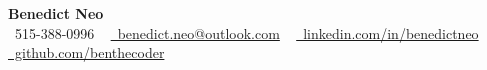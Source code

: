 \begin{center}
    \textbf{\Huge Benedict Neo} \\ \vspace{10pt}
    \small \faPhone\ 515-388-0996  ~ 
    \href{mailto:benedict.neo@outlook.com}{\faEnvelope\ benedict.neo@outlook.com} ~ 
    \href{https://www.linkedin.com/in/benedictneo/}{\faLinkedin\ linkedin.com/in/benedictneo}  ~
    \href{https://github.com/benthecoder/}{\faGithub\ github.com/benthecoder}
    \vspace{7pt}
\end{center}